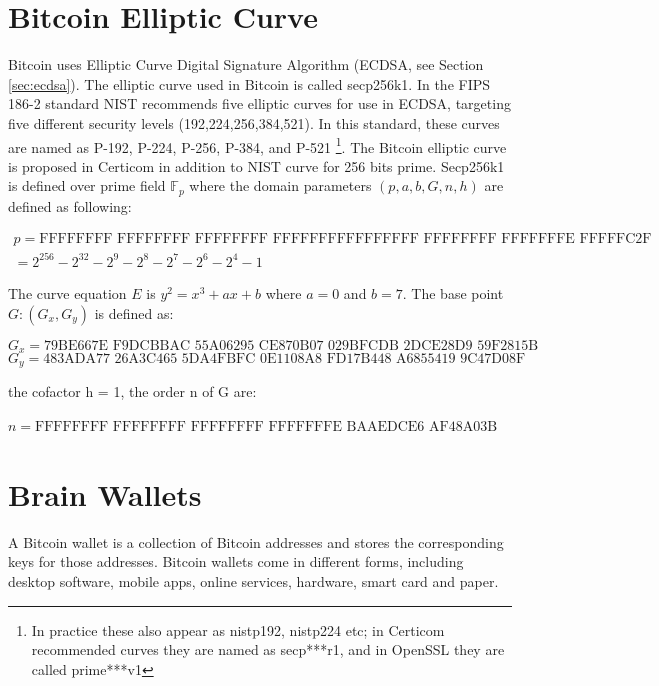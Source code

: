 \section{Bitcoin Elliptic Curve} \label{sec:seckp256k1}
Bitcoin uses Elliptic Curve Digital Signature Algorithm (ECDSA, see Section \ref{sec:ecdsa}). The elliptic curve used in Bitcoin is called secp256k1. In the FIPS 186-2 standard \cite{fips2000186} NIST recommends five elliptic curves for use in ECDSA, targeting five different security levels (192,224,256,384,521). In this standard, these curves are named as P-192, P-224, P-256, P-384, and P-521 \footnote{In practice these also appear as nistp192, nistp224 etc; in Certicom recommended curves they are named as secp***r1, and in OpenSSL they are called prime***v1}. The Bitcoin elliptic curve is proposed in Certicom \cite{certicom2000sec} in addition to NIST curve for 256 bits prime. Secp256k1 is defined over prime field $\mathbb{F}_p$ where the domain parameters $(p,a,b,G,n,h)$ are defined as following:
\begin{footnotesize}
	\begin{multline} \nonumber
	p = \text{FFFFFFFF FFFFFFFF FFFFFFFF FFFFFFFF} \text{FFFFFFFF FFFFFFFF FFFFFFFE FFFFFC2F} \\
	= 2^{256} - 2^{32} - 2^9 - 2^8 - 2^7 - 2^6 - 2^4 - 1 
	\end{multline}
\end{footnotesize}
The curve equation $E$ is $y^2 = x^3 + ax +b $ where $a = 0$ and $b = 7$. The base point $G:(G_x,G_y)$ is defined as:
\begin{footnotesize}
	$$G_x = \text{79BE667E F9DCBBAC 55A06295 CE870B07 029BFCDB 2DCE28D9 59F2815B 16F81798} $$ 
	$$G_y = \text{483ADA77 26A3C465 5DA4FBFC 0E1108A8 FD17B448 A6855419 9C47D08F FB10D4B8}$$
\end{footnotesize}
the cofactor h = 1, the order n of G are: \\
\begin{footnotesize}
	$n = \text{FFFFFFFF FFFFFFFF FFFFFFFF FFFFFFFE BAAEDCE6 AF48A03B BFD25E8C D0364141}$
\end{footnotesize}
\section{Brain Wallets} \label{sec:brainWallet}
A Bitcoin wallet is a collection of Bitcoin addresses and stores the corresponding keys for those addresses. Bitcoin wallets come in different forms, including desktop software, mobile apps, online services, hardware, smart card and paper. 

